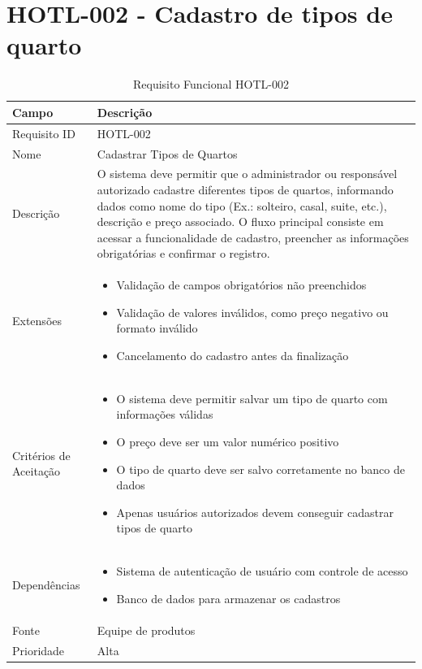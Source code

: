 \documentclass[
    12pt,
    oneside,
    a4paper,
    brazil
]{abntex2}
\begin{document}
\section{HOTL-002 - Cadastro de tipos de quarto}

\begin{table}[h]
	\begin{tabular}{|l|p{10cm}|}
		\hline
		\textbf{Campo} & \textbf{Descrição} \\
		\hline
		Requisito ID & HOTL-002 \\
		\hline
		Nome & Cadastrar Tipos de Quartos \\
		\hline
		Descrição & O sistema deve permitir que o administrador ou responsável autorizado cadastre diferentes tipos de quartos, informando dados como nome do tipo (Ex.: solteiro, casal, suite, etc.), descrição e preço associado. O fluxo principal consiste em acessar a funcionalidade de cadastro, preencher as informações obrigatórias e confirmar o registro. \\
		\hline
		Extensões & \begin{itemize}[leftmargin=*, labelsep=0.5em, noitemsep, topsep=0pt]
		\item Validação de campos obrigatórios não preenchidos
		\item Validação de valores inválidos, como preço negativo ou formato inválido
		\item Cancelamento do cadastro antes da finalização
		\end{itemize} \\
		\hline
		Critérios de Aceitação & \begin{itemize}[leftmargin=*, labelsep=0.5em, noitemsep, topsep=0pt]
		\item O sistema deve permitir salvar um tipo de quarto com informações válidas
		\item O preço deve ser um valor numérico positivo
		\item O tipo de quarto deve ser salvo corretamente no banco de dados
		\item Apenas usuários autorizados devem conseguir cadastrar tipos de quarto
		\end{itemize} \\
		\hline
		Dependências & \begin{itemize}[leftmargin=*, labelsep=0.5em, noitemsep, topsep=0pt] 
		\item Sistema de autenticação de usuário com controle de acesso
		\item Banco de dados para armazenar os cadastros
		\end{itemize} \\
		\hline
		Fonte & Equipe de produtos \\
		\hline
		Prioridade & Alta \\
		\hline
	\end{tabular}
	\caption{Requisito Funcional HOTL-002}
\end{table}
\end{document}
